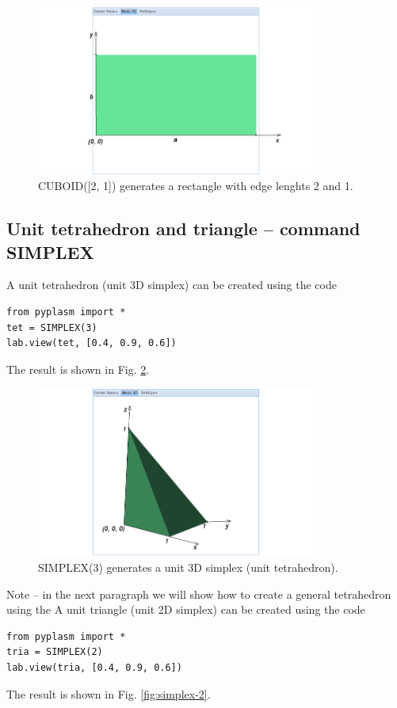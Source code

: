 \documentclass[article,A4,12pt]{llncs}
\begin{document}
\begin{figure}[!ht]
\begin{center}
\includegraphics[width=0.82\textwidth]{img/cuboid-2.png}
\end{center}
\vspace{-2mm}
\caption{CUBOID([2, 1]) generates a rectangle with edge lenghts 2 and 1.}
\label{fig:cuboid-2}
\vspace{-1cm}
\end{figure}
\newpage


\subsection{Unit tetrahedron and triangle -- command SIMPLEX}

A unit tetrahedron (unit 3D simplex) can be created using the code
\begin{verbatim}
from pyplasm import *
tet = SIMPLEX(3)
lab.view(tet, [0.4, 0.9, 0.6])
\end{verbatim}
The result is shown in Fig. \ref{fig:simplex-1}.

\begin{figure}[!ht]
\begin{center}
\includegraphics[width=0.82\textwidth]{img/simplex-1.png}
\end{center}
\vspace{-2mm}
\caption{SIMPLEX(3) generates a unit 3D simplex (unit tetrahedron).}
\label{fig:simplex-1}
\end{figure}
\noindent
Note -- in the next paragraph we will show how to create a general 
tetrahedron using the 
A unit triangle (unit 2D simplex) can be created using the code
\begin{verbatim}
from pyplasm import *
tria = SIMPLEX(2)
lab.view(tria, [0.4, 0.9, 0.6])
\end{verbatim}
The result is shown in Fig. \ref{fig:simplex-2}.
\newpage
\end{document}
